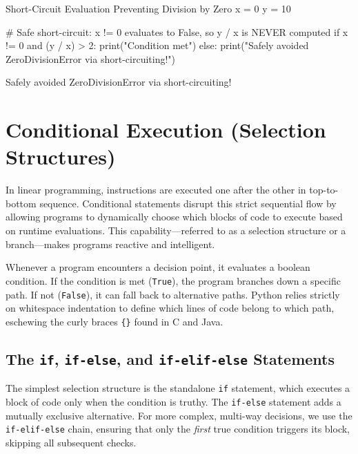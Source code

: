 \begin{pythoncode}{Short-Circuit Evaluation Preventing Division by Zero}
x = 0
y = 10

# Safe short-circuit: x != 0 evaluates to False, so y / x is NEVER computed
if x != 0 and (y / x) > 2:
    print("Condition met")
else:
    print("Safely avoided ZeroDivisionError via short-circuiting!")
\end{pythoncode}
\begin{outputbox}
Safely avoided ZeroDivisionError via short-circuiting!
\end{outputbox}

\section{Conditional Execution (Selection Structures)}

In linear programming, instructions are executed one after the other in top-to-bottom sequence. Conditional statements disrupt this strict sequential flow by allowing programs to dynamically choose which blocks of code to execute based on runtime evaluations. This capability---referred to as a selection structure or a branch---makes programs reactive and intelligent.

Whenever a program encounters a decision point, it evaluates a boolean condition. If the condition is met (\texttt{True}), the program branches down a specific path. If not (\texttt{False}), it can fall back to alternative paths. Python relies strictly on whitespace indentation to define which lines of code belong to which path, eschewing the curly braces \texttt{\{\}} found in C and Java. 

\subsection{The \texttt{if}, \texttt{if-else}, and \texttt{if-elif-else} Statements}

The simplest selection structure is the standalone \texttt{if} statement, which executes a block of code only when the condition is truthy. The \texttt{if-else} statement adds a mutually exclusive alternative. For more complex, multi-way decisions, we use the \texttt{if-elif-else} chain, ensuring that only the \textit{first} true condition triggers its block, skipping all subsequent checks.

